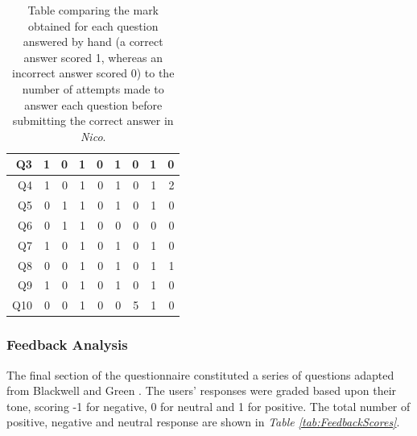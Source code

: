 \documentclass[12pt,twoside,notitlepage,xetex]{report}
\begin{document}
\begin{center}
\begin{table}[H]
\begin{center}
\begin{tabular}{|r||r|r||r|r||r|r||r|r|}
Q3 & 1 & 0 & 1 & 0 & 1 & 0 & 1 & 0\\ \hline
Q4 & 1 & 0 & 1 & 0 & 1 & 0 & 1 & 2\\ \hline
Q5 & 0 & 1 & 1 & 0 & 1 & 0 & 1 & 0\\ \hline
Q6 & 0 & 1 & 1 & 0 & 0 & 0 & 0 & 0\\ \hline
Q7 & 1 & 0 & 1 & 0 & 1 & 0 & 1 & 0\\ \hline
Q8 & 0 & 0 & 1 & 0 & 1 & 0 & 1 & 1\\ \hline
Q9 & 1 & 0 & 1 & 0 & 1 & 0 & 1 & 0\\ \hline
Q10 & 0 & 0 & 1 & 0 & 0 & 5 & 1 & 0\\
\hline
\end{tabular}
\end{center}
\caption{Table comparing the mark obtained for each question answered by hand (a correct answer scored 1, whereas an incorrect answer scored 0) to the number of attempts made to answer each question before submitting the correct answer in \emph{Nico}.}
\label{tab:MarksTries}
\end{table}
\end{center}


\subsubsection{Feedback Analysis}

The final section of the questionnaire constituted a series of questions adapted from Blackwell and Green \cite{Blackwell2000}.  The users' responses were graded based upon their tone, scoring -1 for negative, 0 for neutral and 1 for positive.  The total number of positive, negative and neutral response are shown in \emph{Table \ref{tab:FeedbackScores}}.
\end{document}
